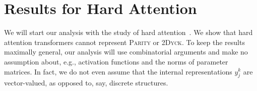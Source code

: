 \documentclass[11pt,a4paper]{article}
\begin{document}















\section{Results for Hard Attention}

We will start our analysis with the study of hard attention~\cite{perez2019turing}.
We show that hard attention transformers cannot represent \textsc{Parity} or \textsc{2Dyck}. %
To keep the results maximally general, our analysis will use combinatorial arguments and make no assumption about, e.g., activation functions and the norms of parameter matrices.
In fact, we do not even assume that the internal representations $y_j^k$ are vector-valued, as opposed to, say, discrete structures.
\end{document}
